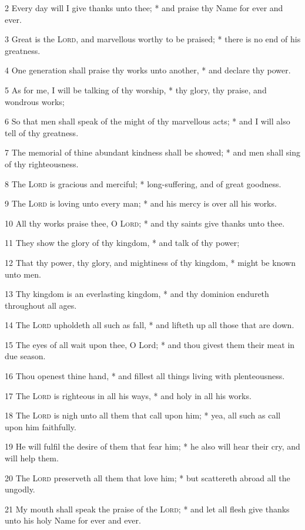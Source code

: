 2 Every day will I give thanks unto thee; * and praise thy Name for ever and ever.\par
3 Great is the {\textsc{Lord}}, and marvellous worthy to be praised; * there is no end of his greatness.\par
4 One generation shall praise thy works unto another, * and declare thy power.\par
5 As for me, I will be talking of thy worship, * thy glory, thy praise, and wondrous works;\par
6 So that men shall speak of the might of thy marvellous acts; * and I will also tell of thy greatness.\par
7 The memorial of thine abundant kindness shall be showed; * and men shall sing of thy righteousness.\par
8 The {\textsc{Lord}} is gracious and merciful; * long-suffering, and of great goodness.\par
9 The {\textsc{Lord}} is loving unto every man; * and his mercy is over all his works.\par
10 All thy works praise thee, O {\textsc{Lord}}; * and thy saints give thanks unto thee.\par
11 They show the glory of thy kingdom, * and talk of thy power;\par
12 That thy power, thy glory, and mightiness of thy kingdom, * might be known unto men.\par
13 Thy kingdom is an everlasting kingdom, * and thy dominion endureth throughout all ages.\par
14 The {\textsc{Lord}} upholdeth all such as fall, * and lifteth up all those that are down.\par
15 The eyes of all wait upon thee, O Lord; * and thou givest them their meat in due season.\par
16 Thou openest thine hand, * and fillest all things living with plenteousness.\par
17 The {\textsc{Lord}} is righteous in all his ways, * and holy in all his works.\par
18 The {\textsc{Lord}} is nigh unto all them that call upon him; * yea, all such as call upon him faithfully.\par
19 He will fulfil the desire of them that fear him; * he also will hear their cry, and will help them.\par
20 The {\textsc{Lord}} preserveth all them that love him; * but scattereth abroad all the ungodly.\par
21 My mouth shall speak the praise of the {\textsc{Lord}}; * and let all flesh give thanks unto his holy Name for ever and ever.
